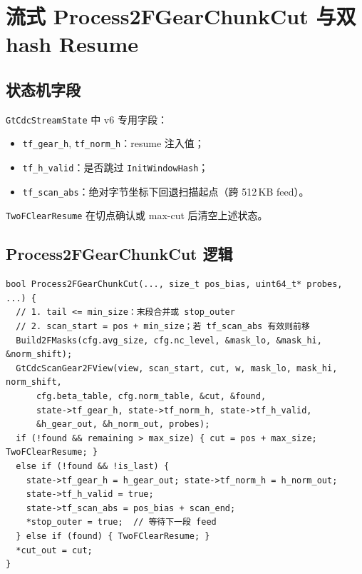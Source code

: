 \chapter{流式 Process2FGearChunkCut 与双 hash Resume}
\label{ch:streaming-resume}

\section{状态机字段}

\texttt{GtCdcStreamState} 中 v6 专用字段：
\begin{itemize}[nosep]
  \item \texttt{tf\_gear\_h}, \texttt{tf\_norm\_h}：resume 注入值；
  \item \texttt{tf\_h\_valid}：是否跳过 \texttt{InitWindowHash}；
  \item \texttt{tf\_scan\_abs}：绝对字节坐标下回退扫描起点（跨 512\,KB feed）。
\end{itemize}

\texttt{TwoFClearResume} 在切点确认或 max-cut 后清空上述状态。

\section{Process2FGearChunkCut 逻辑}

\begin{lstlisting}[caption={Process2FGearChunkCut（\filepath{gt\_cdc\_streaming.cc} 结构）},
  label={lst:process2f}]
bool Process2FGearChunkCut(..., size_t pos_bias, uint64_t* probes, ...) {
  // 1. tail <= min_size：末段合并或 stop_outer
  // 2. scan_start = pos + min_size；若 tf_scan_abs 有效则前移
  Build2FMasks(cfg.avg_size, cfg.nc_level, &mask_lo, &mask_hi, &norm_shift);
  GtCdcScanGear2FView(view, scan_start, cut, w, mask_lo, mask_hi, norm_shift,
      cfg.beta_table, cfg.norm_table, &cut, &found,
      state->tf_gear_h, state->tf_norm_h, state->tf_h_valid,
      &h_gear_out, &h_norm_out, probes);
  if (!found && remaining > max_size) { cut = pos + max_size; TwoFClearResume; }
  else if (!found && !is_last) {
    state->tf_gear_h = h_gear_out; state->tf_norm_h = h_norm_out;
    state->tf_h_valid = true;
    state->tf_scan_abs = pos_bias + scan_end;
    *stop_outer = true;  // 等待下一段 feed
  } else if (found) { TwoFClearResume; }
  *cut_out = cut;
}
\end{lstlisting}

